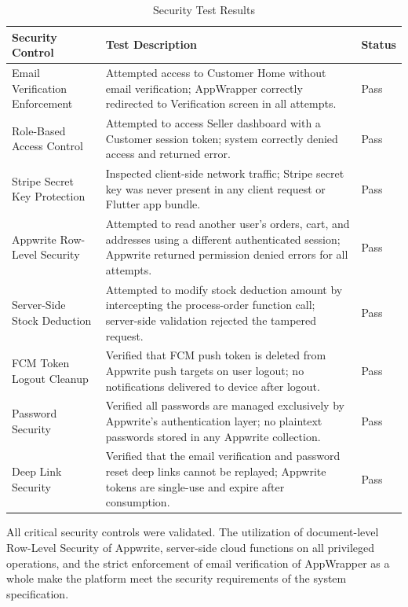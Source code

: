 \begin{table}[H]
\centering
\caption{Security Test Results}
\label{tab:security_testing}
\renewcommand{\arraystretch}{1.3}
\small
\begin{tabular}{|p{4.5cm}|p{5.5cm}|p{2.5cm}|}
\hline
\rowcolor{lightgray}
\textbf{Security Control} & \textbf{Test Description} & \textbf{Status} \\
\hline
Email Verification Enforcement & Attempted access to Customer Home without email verification; AppWrapper correctly redirected to Verification screen in all attempts. & Pass \\
\hline
Role-Based Access Control & Attempted to access Seller dashboard with a Customer session token; system correctly denied access and returned error. & Pass \\
\hline
Stripe Secret Key Protection & Inspected client-side network traffic; Stripe secret key was never present in any client request or Flutter app bundle. & Pass \\
\hline
Appwrite Row-Level Security & Attempted to read another user's orders, cart, and addresses using a different authenticated session; Appwrite returned permission denied errors for all attempts. & Pass \\
\hline
Server-Side Stock Deduction & Attempted to modify stock deduction amount by intercepting the process-order function call; server-side validation rejected the tampered request. & Pass \\
\hline
FCM Token Logout Cleanup & Verified that FCM push token is deleted from Appwrite push targets on user logout; no notifications delivered to device after logout. & Pass \\
\hline
Password Security & Verified all passwords are managed exclusively by Appwrite's authentication layer; no plaintext passwords stored in any Appwrite collection. & Pass \\
\hline
Deep Link Security & Verified that the email verification and password reset deep links cannot be replayed; Appwrite tokens are single-use and expire after consumption. & Pass \\
\hline
\end{tabular}
\end{table}

All critical security controls were validated. The utilization of document-level Row-Level Security of Appwrite, server-side cloud functions on all privileged operations, and the strict enforcement of email verification of AppWrapper as a whole make the platform meet the security requirements of the system specification.

